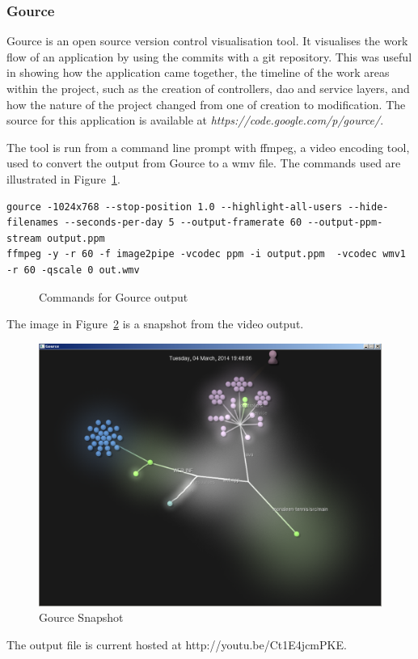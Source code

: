 \subsubsection{Gource}

Gource is an open source version control visualisation tool. It visualises the work flow of an application by using the commits with a git repository. This was useful in showing how the application came together, the timeline of the work areas within the project, such as the creation of controllers, dao and service layers, and how the nature of the project changed from one of creation to modification. The source for this application is available at \textit{https://code.google.com/p/gource/}.

The tool is run from a command line prompt with ffmpeg, a video encoding tool, used to convert the output from Gource to a wmv file. The commands used are illustrated in Figure~\ref{fig:gourcecmd}.
\newpage
\begin{lstlisting}
gource -1024x768 --stop-position 1.0 --highlight-all-users --hide-filenames --seconds-per-day 5 --output-framerate 60 --output-ppm-stream output.ppm
ffmpeg -y -r 60 -f image2pipe -vcodec ppm -i output.ppm  -vcodec wmv1 -r 60 -qscale 0 out.wmv
\end{lstlisting}
\begin{figure}
\caption{Commands for Gource output}
\label{fig:gourcecmd}
\end{figure}

The image in Figure~\ref{fig:gource} is a snapshot from the video output.

\begin{figure}[H]
\begin{center}
\includegraphics[scale=0.45]{gource.png}
\caption{Gource Snapshot}
\label{fig:gource}
\end{center}
\end{figure}

The output file is current hosted at http://youtu.be/Ct1E4jcmPKE.

